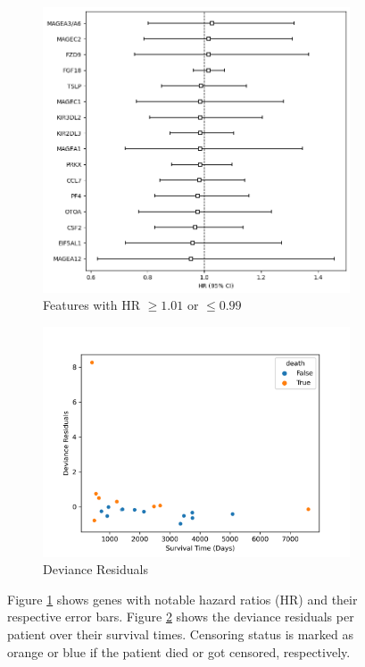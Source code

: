 \begin{figure}[h!t]
    \centering

     \begin{subfigure}[b]{0.49\textwidth}
         \centering
         \includegraphics[width=\textwidth]{latex/figures/impactful_genes_hazard_ratio.png}
         \caption{Features with HR $\ge 1.01$ or $\le 0.99$}
         \label{fig:HRGenes}
     \end{subfigure}
    \hfill
     \begin{subfigure}[b]{0.49\textwidth}
         \centering
         \includegraphics[width=\textwidth]{latex/figures/deviance_residuals_rcc.png}
         \caption{Deviance Residuals}
         \label{fig:DevianceResiduals}
     \end{subfigure}

    \hfill
    \caption[Baseline model on genomic data]{
    Figure \ref{fig:HRGenes} shows genes with notable hazard ratios (HR) and their respective error bars.
    Figure \ref{fig:DevianceResiduals} shows the deviance residuals per patient over their survival times. Censoring status is marked as orange or blue if the patient died or got censored, respectively.}
    \label{fig:BaselineModel}
\end{figure}

